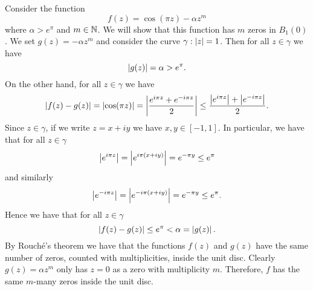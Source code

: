 \begin{example}
    Consider the function
    \[
        f(z) = \cos(\pi z) - \alpha z^m
    \]
    where $\alpha > e^\pi$ and $m \in \mathbb{N}$.
    We will show that this function has $m$ zeros in $B_1(0)$.
    We set $g(z) = -\alpha z^m$ and consider the curve $\gamma: \left\lvert z\right\rvert = 1$.
    Then for all $z \in \gamma$ we have
    \[
        \left\lvert g(z)\right\rvert = \alpha > e^\pi.
    \]
    On the other hand, for all $z \in \gamma$ we have
    \[
        \left\lvert f(z) - g(z)\right\rvert 
        = \left\lvert\cos(\pi z)\right\rvert 
        = \left\lvert \frac{e^{i\pi z} + e^{-i\pi z}}{2} \right\rvert
        \leq \frac{\left\lvert e^{i\pi z}\right\rvert + \left\lvert e^{-i\pi z}\right\rvert}{2}.
    \]
    Since $z \in \gamma$, if we write $z = x + iy$ we have $x,y \in [-1,1]$.
    In particular, we have that for all $z \in \gamma$
    \[
        \left\lvert e^{i\pi z}\right\rvert = \left\lvert e^{i\pi(x + iy)}\right\rvert = e^{-\pi y} \leq e^\pi
    \]
    and similarly
    \[
        \left\lvert e^{-i\pi z}\right\rvert = \left\lvert e^{-i\pi(x + iy)}\right\rvert = e^{-\pi y} \leq e^\pi.
    \]
    Hence we have that for all $z \in \gamma$
    \[
        \left\lvert f(z) - g(z)\right\rvert \leq e^\pi < \alpha = \left\lvert g(z)\right\rvert.
    \]
    By Rouch\'e's theorem we have that the functions $f(z)$ and $g(z)$ have the same number of zeros,
    counted with multiplicities, inside the unit disc.
    Clearly $g(z) = \alpha z^m$ only has $z = 0$ as a zero with multiplicity $m$.
    Therefore, $f$ has the same $m$-many zeros inside the unit disc.
\end{example}
